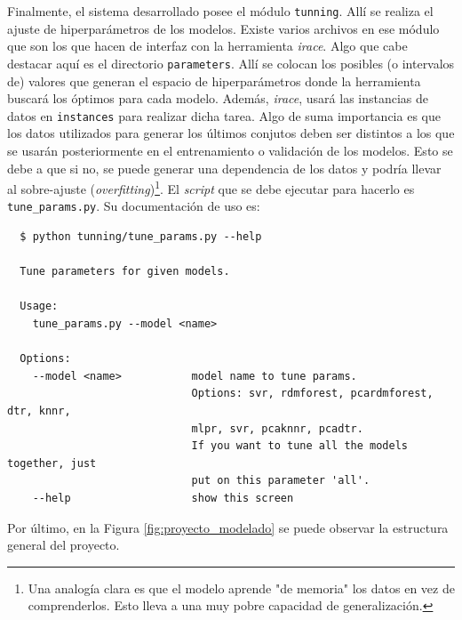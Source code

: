 \begin{appendix}
\begin{lstlisting}
  \end{lstlisting}

\par Finalmente, el sistema desarrollado posee el módulo \verb|tunning|.
  Allí se realiza el ajuste de hiperparámetros de los modelos.
  Existe varios archivos en ese módulo que son los que hacen de interfaz
  con la herramienta \textit{irace}. Algo que cabe destacar aquí es el
  directorio \verb|parameters|. Allí se colocan los posibles
  (o intervalos de) valores que generan el espacio de hiperparámetros
  donde la herramienta buscará los óptimos para cada modelo. Además,
  \textit{irace}, usará las instancias de datos en \verb|instances|
  para realizar dicha tarea. Algo de suma importancia es que
  los datos utilizados para generar los últimos conjutos deben ser distintos
  a los que se usarán posteriormente en el entrenamiento o validación de
  los modelos. Esto se debe a que si no, se puede generar una dependencia
  de los datos y podría llevar al sobre-ajuste (\textit{overfitting})\footnote{Una
  analogía clara es que el modelo aprende "de memoria" los datos en vez de
  comprenderlos. Esto lleva a una muy pobre capacidad de generalización.}.
  El \textit{script} que se debe ejecutar para hacerlo es \verb|tune_params.py|.
  Su documentación de uso es:
  \begin{lstlisting}
  $ python tunning/tune_params.py --help

  Tune parameters for given models.

  Usage:
    tune_params.py --model <name>

  Options:
    --model <name>           model name to tune params.
                             Options: svr, rdmforest, pcardmforest, dtr, knnr,
                             mlpr, svr, pcaknnr, pcadtr.
                             If you want to tune all the models together, just
                             put on this parameter 'all'.
    --help                   show this screen

  \end{lstlisting}
\par Por último, en la Figura \ref{fig:proyecto_modelado} se puede observar
  la estructura general del proyecto.


\end{appendix}
